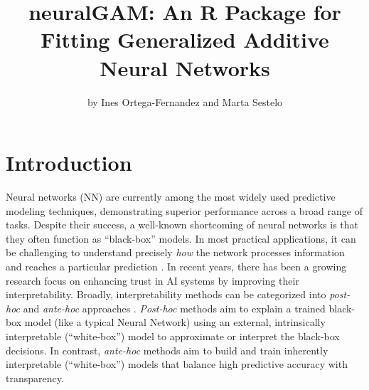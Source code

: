 \title{neuralGAM: An R Package for Fitting Generalized Additive Neural Networks}
\author{by Ines Ortega-Fernandez and Marta Sestelo}

\maketitle


\section{Introduction}

Neural networks (NN) are currently among the most widely used predictive modeling techniques, demonstrating superior performance across a broad range of tasks. Despite their success, a well-known shortcoming of neural networks is that they often function as ``black-box'' models. In most practical applications, it can be challenging to understand precisely \emph{how} the network processes information and reaches a particular prediction \citep{szegedy2013intriguing}. In recent years, there has been a growing research focus on enhancing trust in AI systems by improving their interpretability. Broadly, interpretability methods can be categorized into \emph{post-hoc} and \emph{ante-hoc} approaches \citep{dovsilovic2018explainable}. \emph{Post-hoc} methods aim to explain a trained black-box model (like a typical Neural Network) using an external, intrinsically interpretable (``white-box'') model to approximate or interpret the black-box decisions. In contrast, \emph{ante-hoc} methods aim to build and train inherently interpretable (``white-box'') models that balance high predictive accuracy with transparency. 

